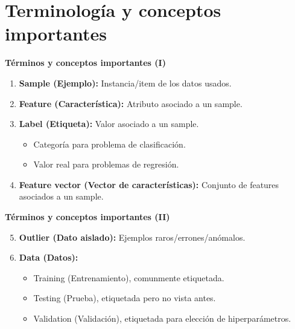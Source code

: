 \documentclass[english,svgnames,notes=hide,12pt]{beamer}
\begin{document}
\section{Terminolog\'ia y conceptos importantes}
\begin{frame}
    \textbf{Términos y conceptos importantes (I)}
    \begin{enumerate}
        \item \textbf{Sample (Ejemplo):} Instancia/item de los datos usados.
        \item \textbf{Feature (Característica):} Atributo asociado a un sample.
        \item \textbf{Label (Etiqueta):} Valor asociado a un sample.
            \begin{itemize}
                \item Categoría para problema de clasificación.
                \item Valor real para problemas de regresión.
            \end{itemize}
        \item \textbf{Feature vector (Vector de caracter\'isticas):} Conjunto de features asociados a un sample.
    \end{enumerate}

\end{frame}

\begin{frame}
    \textbf{Términos y conceptos importantes (II)}
    \begin{enumerate}
        \setcounter{enumi}{4}
        \item \textbf{Outlier (Dato aislado):} Ejemplos raros/errones/anómalos.
        \item \textbf{Data (Datos):}
                \begin{itemize}
                    \item Training (Entrenamiento), comunmente etiquetada.
                    \item Testing (Prueba), etiquetada pero no vista antes.
                    \item Validation (Validación), etiquetada para elección de hiperparámetros.
                \end{itemize}
    \end{enumerate}

\end{frame}
\end{document}
